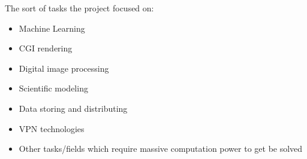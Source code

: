 The sort of tasks the project focused on:

\begin{itemize}
    \item Machine Learning
    \item CGI rendering
    \item Digital image processing
    \item Scientific modeling
    \item Data storing and distributing
    \item VPN technologies
    \item Other tasks/fields which require massive computation power to get be solved
\end{itemize}
